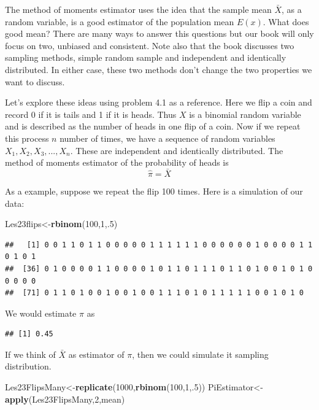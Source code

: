 \documentclass[]{book}
\newenvironment{Shaded}{\begin{snugshade}}{\end{snugshade}}
\newcommand{\KeywordTok}[1]{\textcolor[rgb]{0.13,0.29,0.53}{\textbf{#1}}}
\newcommand{\DecValTok}[1]{\textcolor[rgb]{0.00,0.00,0.81}{#1}}
\newcommand{\NormalTok}[1]{#1}
\theoremstyle{definition}
\theoremstyle{definition}
\theoremstyle{definition}
\theoremstyle{remark}
\begin{document}
The method of moments estimator uses the idea that the sample mean
\(\bar{X}\), as a random variable, is a good estimator of the population
mean \(E(x)\). What does good mean? There are many ways to answer this
questions but our book will only focus on two, unbiased and consistent.
Note also that the book discusses two sampling methods, simple random
sample and independent and identically distributed. In either case,
these two methods don't change the two properties we want to discuss.

Let's explore these ideas using problem 4.1 as a reference. Here we flip
a coin and record 0 if it is tails and 1 if it is heads. Thus \(X\) is a
binomial random variable and is described as the number of heads in one
flip of a coin. Now if we repeat this process \(n\) number of times, we
have a sequence of random variables \(X_{1},X_{2},X_{3},...,X_{n}\).
These are independent and identically distributed. The method of moments
estimator of the probability of heads is \[\hat{\pi}=\bar{X}\]

As a example, suppose we repeat the flip 100 times. Here is a simulation
of our data:

\begin{Shaded}
\begin{Highlighting}[]
\NormalTok{Les23flips<-}\KeywordTok{rbinom}\NormalTok{(}\DecValTok{100}\NormalTok{,}\DecValTok{1}\NormalTok{,.}\DecValTok{5}\NormalTok{)}
\end{Highlighting}
\end{Shaded}

\begin{verbatim}
##   [1] 0 0 1 1 0 1 1 0 0 0 0 0 1 1 1 1 1 1 0 0 0 0 0 0 1 0 0 0 0 1 1 0 1 0 1
##  [36] 0 1 0 0 0 0 1 1 0 0 0 0 1 0 1 1 0 1 1 1 0 1 1 0 1 0 0 1 0 1 0 0 0 0 0
##  [71] 0 1 1 0 1 0 0 1 0 0 1 0 0 1 1 1 0 1 0 1 1 1 1 1 0 0 1 0 1 0
\end{verbatim}

We would estimate \(\hat{\pi}\) as

\begin{verbatim}
## [1] 0.45
\end{verbatim}

If we think of \(\bar{X}\) as estimator of \(\pi\), then we could
simulate it sampling distribution.

\begin{Shaded}
\begin{Highlighting}[]
\NormalTok{Les23FlipsMany<-}\KeywordTok{replicate}\NormalTok{(}\DecValTok{1000}\NormalTok{,}\KeywordTok{rbinom}\NormalTok{(}\DecValTok{100}\NormalTok{,}\DecValTok{1}\NormalTok{,.}\DecValTok{5}\NormalTok{))}
\NormalTok{PiEstimator<-}\KeywordTok{apply}\NormalTok{(Les23FlipsMany,}\DecValTok{2}\NormalTok{,mean)}
\end{Highlighting}
\end{Shaded}
\end{document}
